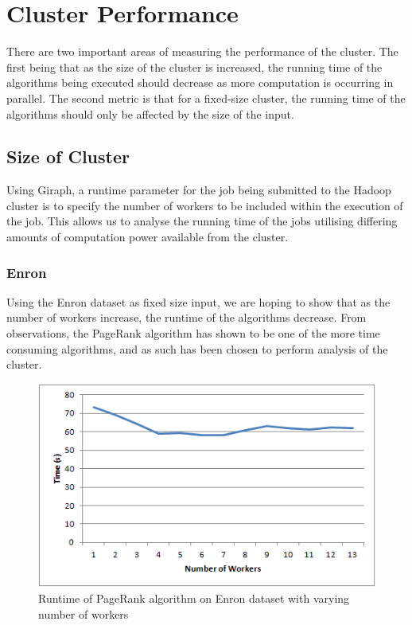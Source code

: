 \section{Cluster Performance}
There are two important areas of measuring the performance of the cluster. The first being that as the size of the cluster is increased, the running time of the algorithms being executed should decrease as more computation is occurring in parallel. The second metric is that for a fixed-size cluster, the running time of the algorithms should only be affected by the size of the input.

\subsection{Size of Cluster}
Using Giraph, a runtime parameter for the job being submitted to the Hadoop cluster is to specify the number of workers to be included within the execution of the job. This allows us to analyse the running time of the jobs utilising differing amounts of computation power available from the cluster.

\subsubsection{Enron}
Using the Enron dataset as fixed size input, we are hoping to show that as the number of workers increase, the runtime of the algorithms decrease. From observations, the PageRank algorithm has shown to be one of the more time consuming algorithms, and as such has been chosen to perform analysis of the cluster.

\begin{figure}[htbp]%
\centering
\includegraphics[]{./img/pagerank-enron-benchmark}%
\caption{Runtime of PageRank algorithm on Enron dataset with varying number of workers}%
\label{fig:enronbenchmark}%
\end{figure}

